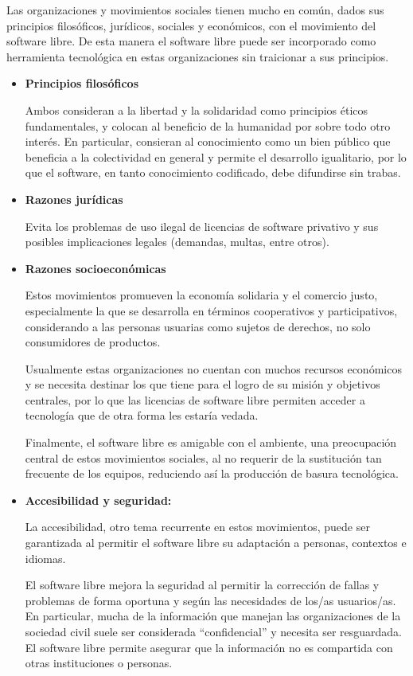 Las organizaciones y movimientos sociales tienen mucho en común, dados sus principios filosóficos, jurídicos, sociales y económicos, con el movimiento del software libre. De esta manera el software libre puede ser incorporado como herramienta tecnológica en estas organizaciones sin traicionar a sus principios.

\begin{itemize}

\item {\bf Principios filosóficos}

Ambos consideran a la libertad y la solidaridad como principios éticos fundamentales, y colocan al beneficio de la humanidad por sobre todo otro interés. En particular, consieran al conocimiento como un bien público que beneficia a la colectividad en general y permite el desarrollo igualitario, por lo que el software, en tanto conocimiento codificado, debe difundirse sin trabas.

\item {\bf Razones jurídicas}

Evita los problemas de uso ilegal de licencias de software privativo y sus posibles implicaciones legales (demandas, multas, entre otros).

\item {\bf Razones socioeconómicas}

Estos movimientos promueven la economía solidaria y el comercio justo, especialmente la que se desarrolla en términos cooperativos y participativos, considerando a las personas usuarias como sujetos de derechos, no solo consumidores de productos.

Usualmente estas organizaciones no cuentan con muchos recursos económicos y se necesita destinar los que tiene para el logro de su misión y objetivos centrales, por lo que las licencias de software libre permiten acceder a tecnología que de otra forma les estaría vedada.

Finalmente, el software libre es amigable con el ambiente, una preocupación central de estos movimientos sociales, al no requerir de la sustitución tan frecuente de los equipos, reduciendo así la producción de basura tecnológica.

\item {\bf Accesibilidad y seguridad:}

La accesibilidad, otro tema recurrente en estos movimientos, puede ser garantizada al permitir el software libre su adaptación a personas, contextos e idiomas.

El software libre mejora la seguridad al permitir la corrección de fallas y problemas de forma oportuna  y según las necesidades de los/as usuarios/as. En particular, mucha de la información que manejan las organizaciones de la sociedad civil suele ser considerada ``confidencial'' y necesita ser resguardada. El software libre permite asegurar que la información no es compartida con otras instituciones o personas.

\end{itemize}


